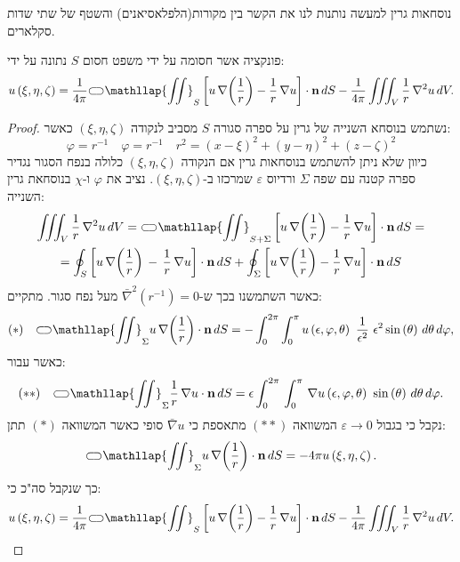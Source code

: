 \documentclass{tstextbook}
\begin{document}
\begin{remark}
נוסחאות גרין למעשה נותנות לנו את הקשר בין מקורות(הלפלאסיאנים) והשטף של שתי שדות סקלארים.

\end{remark}
\begin{corollary}
פונקציה אשר חסומה על ידי משפט חסום \(S\) נתונה על ידי:
$$u\left( \xi,\eta,\zeta \right)={\frac{1}{4\pi}}{\subset\!\supset} \mathllap{\iint}_{S}\left[u\,\nabla\!\left({\frac{1}{r}}\right)-{\frac{1}{r}}\,\nabla u\right]\cdot\mathbf{n}\,d S-{\frac{1}{4\pi}}\iiint_{V}{\frac{1}{r}}\,\nabla^{2}u\,d V.$$

\end{corollary}
\begin{proof}
נשתמש בנוסחא השנייה של גרין על ספרה סגורה \(S\) מסביב לנקודה \((\xi,\eta,\zeta)\) כאשר:
$$\varphi=r^{-1} \quad \varphi=r^{-1}\quad r^{2}=\left( x{-}\xi \right)^{2}{+}\left( y{-}\eta \right)^{2}{+}\left( z{-}\zeta \right)^{2}$$
כיוון שלא ניתן להשתמש בנוסחאות גרין אם הנקודה \(\left( \xi,\eta,\zeta \right)\) כלולה בנפח הסגור נגדיר ספרה קטנה עם שפה \(\Sigma\) ורדיוס \(\varepsilon\) שמרכזו ב-\((\xi,\eta,\zeta)\). נציב את \(\varphi\) ו-\(\chi\) בנוסחאת גרין השנייה:
\begin{gather*}\iiint_{V}{\frac{1}{r}}\,\nabla^{2}u\,d V={\subset\!\supset} \mathllap{\iint}_{S+\Sigma}\left[u\,\nabla\!\left({\frac{1}{r}}\right)-{\frac{1}{r}}\,\nabla u\right]\cdot\mathbf{n}\,d S=\\=\oint_{S}\left[u\,\nabla\!\left({\frac{1}{r}}\right)\,-\,{\frac{1}{r}}\,\nabla u\right]\cdot\mathbf{n}\,d S+\oint_{\Sigma}\left[u\,\nabla\!\left({\frac{1}{r}}\right)-{\frac{1}{r}}\,\nabla u\right]\cdot\mathbf{n}\,d S 
\end{gather*}
כאשר השתמשנו בכך ש-\(\bar{\nabla}^2(r^{-1})=0\) מעל נפח סגור. מתקיים:
$$(*)\quad {\subset\!\supset} \mathllap{\iint}_{\Sigma}u\,\nabla\!\left({\frac{1}{r}}\right)\cdot\mathbf{n}\,d S=-\int_{0}^{2\pi}\int_{0}^{\pi}u\left( \epsilon,\varphi,\theta \right)\,\,{\frac{1}{\epsilon^{2}}}\,\,\epsilon^{2}\sin\left( \theta \right)\,d\theta\,d\varphi,$$
כאשר עבור:
$$(* *)\quad {\subset\!\supset} \mathllap{\iint}_{\Sigma}{\frac{1}{r}}\,\nabla u\cdot\mathbf{n}\,d S=\epsilon\int_{0}^{2\pi}\,\int_{0}^{\pi}\,\nabla u\left( \epsilon,\varphi,\theta \right)\ \sin\left( \theta \right)\,d\theta\,d\varphi.$$
נקבל כי בגבול \(\varepsilon\to 0\) המשוואה \((* *)\) מתאספת כי \(\bar{\nabla}u\) סופי כאשר המשוואה \((*)\) תתן:
$${\subset\!\supset} \mathllap{\iint}_{\Sigma}u\,\nabla\!\left({\frac{1}{r}}\right)\cdot\mathbf{n}\,d S=-4\pi u\left( \xi,\eta,\zeta \right).$$
כך שנקבל סה"כ כי:
$$u\left( \xi,\eta,\zeta \right)={\frac{1}{4\pi}}{\subset\!\supset} \mathllap{\iint}_{S}\left[u\,\nabla\!\left({\frac{1}{r}}\right)-{\frac{1}{r}}\,\nabla u\right]\cdot\mathbf{n}\,d S-{\frac{1}{4\pi}}\iiint_{V}{\frac{1}{r}}\,\nabla^{2}u\,d V.$$

\end{proof}
\end{document}
